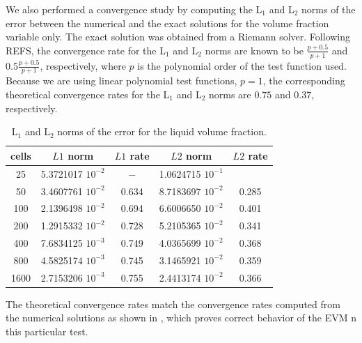 \documentclass[preprint,10pt]{elsarticle}
\begin{document}
We also performed a convergence study by computing the L$_1$ and L$_2$ norms of the error between the numerical and the exact solutions for the volume fraction variable only. The exact solution was obtained from a Riemann solver. Following REFS, the convergence rate for the L$_1$ and L$_2$ norms are known to be $\frac{p+0.5}{p+1}$ and $0.5\frac{p+0.5}{p+1}$, respectively, where $p$ is the polynomial order of the test function used. Because we are using linear polynomial test functions, $p=1$, the corresponding theoretical convergence rates for the L$_1$ and L$_2$ norms are $0.75$ and $0.37$, respectively. 
%
\begin{table}[H]
\begin{center}
 \caption{\label{tbl:conv_rate_norm} L$_1$ and L$_2$ norms of the error for the liquid volume fraction.}
 \begin{tabular}{|c|c|c|c|c|}
 \hline
cells  & $L1$ norm  & $L1$ rate   & $L2$ norm & $L2$ rate  \\ \hline
25     & 5.3721017 $10^{-2}$ & $-$    & 1.0624715 $10^{-1}$ & \\ \hline
50     & 3.4607761 $10^{-2}$ & 0.634 & 8.7183697 $10^{-2}$  & 0.285 \\ \hline
100   & 2.1396498 $10^{-2}$ & 0.694 & 6.6006650 $10^{-2}$  & 0.401 \\ \hline
200   & 1.2915332 $10^{-2}$ & 0.728 & 5.2105365 $10^{-2}$  & 0.341 \\ \hline
400   & 7.6834125 $10^{-3}$ & 0.749 & 4.0365699 $10^{-2}$  & 0.368 \\ \hline
800   & 4.5825174 $10^{-3}$ & 0.745 & 3.1465921 $10^{-2}$  & 0.359 \\ \hline
1600 & 2.7153206 $10^{-3}$ & 0.755 & 2.4413174 $10^{-2}$ & 0.366 \\ \hline
\end{tabular}
\end{center}
\end{table}
%
The theoretical convergence rates match the convergence rates computed from the numerical solutions as shown in , which proves correct behavior of the EVM n this particular test.
%
\end{document}
